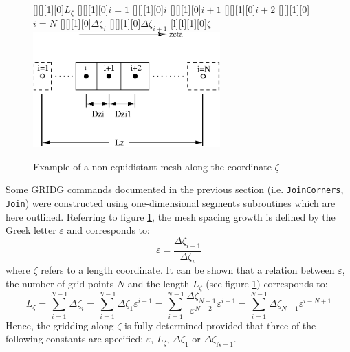 \documentclass{warpdoc}
\newcommand{\fontxfig}{\footnotesize\scalefont{0.918}}
\begin{document}
%
\begin{figure}[!b]
\vspace{0.3cm}
\center
   \fontxfig
   [][][1][0]{$L_{\zeta}$}
   [][][1][0]{$i=1$}
   [][][1][0]{$i$}
   [][][1][0]{$i+1$}
  [][][1][0]{$i+2$}
  [][][1][0]{$i=N$}
   [][][1][0]{$\Delta \zeta_i$}
   [][][1][0]{$\Delta \zeta_{i+1}$}
  [l][l][1][0]{$\zeta$}
   \includegraphics[width=2.83in]{meshspacing.eps}
\caption{Example of a non-equidistant mesh along the coordinate $\zeta$}
\label{fig:meshspacing}
\end{figure}
%

Some GRIDG commands documented in the previous section (i.e. \verb|JoinCorners|,
\verb|Join|) were constructed
using one-dimensional segments subroutines which are here outlined.
Referring to figure \ref{fig:meshspacing}, the mesh spacing
growth is defined by the Greek letter $\varepsilon$ and corresponds to:
%
\begin{equation}
\varepsilon=\frac{\Delta \zeta_{i+1} }{\Delta \zeta_{i}}
\label{eqn:spacing-growth}
\end{equation}
%
where $\zeta$ refers to a length coordinate.
It can be shown that a relation between $\varepsilon$, the number of
grid points $N$ and the length $L_{\zeta}$ (see figure \ref{fig:meshspacing})
corresponds to:
%
\begin{equation}
 L_{\zeta}=\sum_{i=1}^{N-1} \Delta \zeta_i
          =\sum_{i=1}^{N-1} \Delta \zeta_1 \varepsilon^{i-1}
          =\sum_{i=1}^{N-1} \frac{\Delta \zeta_{N-1}}{\varepsilon^{N-2}}\varepsilon^{i-1}
          =\sum_{i=1}^{N-1} {\Delta \zeta_{N-1}}\varepsilon^{i-N+1}
\label{eqn:spacing-growth-length}
\end{equation}
%
Hence, the gridding along $\zeta$ is fully determined provided
that three of the following constants are specified: $\varepsilon$, $L_\zeta$,
$\Delta \zeta_1$ or $\Delta \zeta_{N-1}$.
\end{document}
